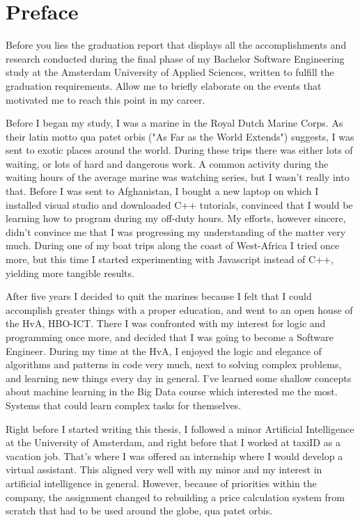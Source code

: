 \section*{Preface}
Before you lies the graduation report that displays all the accomplishments and research conducted during the final phase of my Bachelor Software Engineering study at the Amsterdam University of Applied Sciences, written to fulfill the graduation requirements. Allow me to briefly elaborate on the events that motivated me to reach this point in my career.

Before I began my study, I was a marine in the Royal Dutch Marine Corps. As their latin motto qua patet orbis ("As Far as the World Extends") suggests, I was sent to exotic places around the world. During these trips there was either lots of waiting, or lots of hard and dangerous work. A common activity during the waiting hours of the average marine was watching series, but I wasn’t really into that. Before I was sent to Afghanistan, I bought a new laptop on which I installed visual studio and downloaded C++ tutorials, convinced that I would be learning how to program during my off-duty hours. My efforts, however sincere, didn't convince me that I was progressing my understanding of the matter very much. During one of my boat trips along the coast of West-Africa I tried once more, but this time I started experimenting with Javascript instead of C++, yielding more tangible results.

After five years I decided to quit the marines because I felt that I could accomplish greater things with a proper education, and went to an open house of the HvA, HBO-ICT. There I was confronted with my interest for logic and programming once more, and decided that I was going to become a Software Engineer. During my time at the HvA, I enjoyed the logic and elegance of algorithms and patterns in code very much, next to solving complex problems, and learning new things every day in general. I’ve learned some shallow concepts about machine learning in the Big Data course which interested me the most. Systems that could learn complex tasks for themselves.

Right before I started writing this thesis, I followed a minor Artificial Intelligence at the University of Amsterdam, and right before that I worked at taxiID as a vacation job. That’s where I was offered an internship where I would develop a virtual assistant. This aligned very well with my minor and my interest in artificial intelligence in general. However, because of priorities within the company, the assignment changed to rebuilding a price calculation system from scratch that had to be used around the globe, qua patet orbis.

